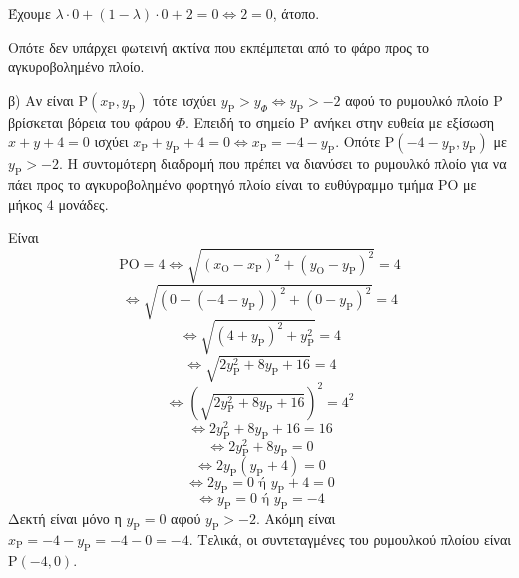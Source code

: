 Έχουμε $\lambda \cdot 0 + (1-\lambda) \cdot 0 + 2 = 0 \Leftrightarrow 2 = 0$, άτοπο.

Οπότε δεν υπάρχει φωτεινή ακτίνα που εκπέμπεται από το φάρο προς το αγκυροβολημένο πλοίο.

\textnormal{β)} Αν είναι $\mathrm{P}(x_\mathrm{P}, y_\mathrm{P})$ τότε ισχύει $y_\mathrm{P} > y_\Phi \Leftrightarrow y_\mathrm{P} > -2$ αφού το ρυμουλκό πλοίο $\mathrm{P}$ βρίσκεται βόρεια του φάρου $\Phi$.
Επειδή το σημείο $\mathrm{P}$ ανήκει στην ευθεία με εξίσωση $x+y+4=0$ ισχύει $x_\mathrm{P}+y_\mathrm{P}+4=0 \Leftrightarrow x_\mathrm{P}=-4-y_\mathrm{P}$. Οπότε $\mathrm{P}(-4-y_\mathrm{P}, y_\mathrm{P})$ με $y_\mathrm{P} > -2$.
Η συντομότερη διαδρομή που πρέπει να διανύσει το ρυμουλκό πλοίο για να πάει προς το αγκυροβολημένο φορτηγό πλοίο είναι το ευθύγραμμο τμήμα $\mathrm{PO}$ με μήκος 4 μονάδες.

Είναι
\[
\mathrm{PO} = 4 \Leftrightarrow \sqrt{(x_\mathrm{O} - x_\mathrm{P})^2 + (y_\mathrm{O} - y_\mathrm{P})^2} = 4
\]
\[
\Leftrightarrow \sqrt{(0 - (-4-y_\mathrm{P}))^2 + (0 - y_\mathrm{P})^2} = 4
\]
\[
\Leftrightarrow \sqrt{(4+y_\mathrm{P})^2 + y_\mathrm{P}^2} = 4
\]
\[
\Leftrightarrow \sqrt{2y_\mathrm{P}^2 + 8y_\mathrm{P} + 16} = 4
\]
\[
\Leftrightarrow \left(\sqrt{2y_\mathrm{P}^2 + 8y_\mathrm{P} + 16}\right)^2 = 4^2
\]
\[
\Leftrightarrow 2y_\mathrm{P}^2 + 8y_\mathrm{P} + 16 = 16
\]
\[
\Leftrightarrow 2y_\mathrm{P}^2 + 8y_\mathrm{P} = 0
\]
\[
\Leftrightarrow 2y_\mathrm{P}(y_\mathrm{P} + 4) = 0
\]
\[
\Leftrightarrow 2y_\mathrm{P} = 0 \text{ ή } y_\mathrm{P} + 4 = 0
\]
\[
\Leftrightarrow y_\mathrm{P} = 0 \text{ ή } y_\mathrm{P} = -4
\]
Δεκτή είναι μόνο η $y_\mathrm{P}=0$ αφού $y_\mathrm{P} > -2$. Ακόμη είναι $x_\mathrm{P}=-4-y_\mathrm{P}=-4-0=-4$.
Τελικά, οι συντεταγμένες του ρυμουλκού πλοίου είναι $\mathrm{P}(-4,0)$.

\